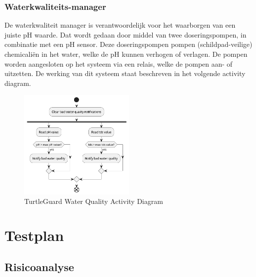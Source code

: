 \documentclass[a4paper]{report}
\newcommand{\turtleguard}{\mbox{TurtleGuard\texttrademark}\xspace}
\begin{document}
\subsection{Waterkwaliteits-manager}
\label{sec:wqmgr}
De waterkwaliteit manager is verantwoordelijk voor het waarborgen van een juiste pH waarde. 
Dat wordt gedaan door middel van twee doseringspompen, in combinatie met een pH sensor.
Deze doseringspompen pompen (schildpad-veilige) chemicaliën in het water, welke de pH kunnen verhogen of verlagen.
De pompen worden aangesloten op het systeem via een relais, welke de pompen aan- of uitzetten.
De werking van dit systeem staat beschreven in het volgende activity diagram. 
\begin{figure}[H]
  \centering
  \includegraphics[width=0.5\textwidth]{Images/ActivityDiagramQuality.png}
  \caption{\turtleguard Water Quality Activity Diagram}
  \label{fig:activitydiagram}
\end{figure}

\chapter{Testplan}
\section{Risicoanalyse}
\end{document}
